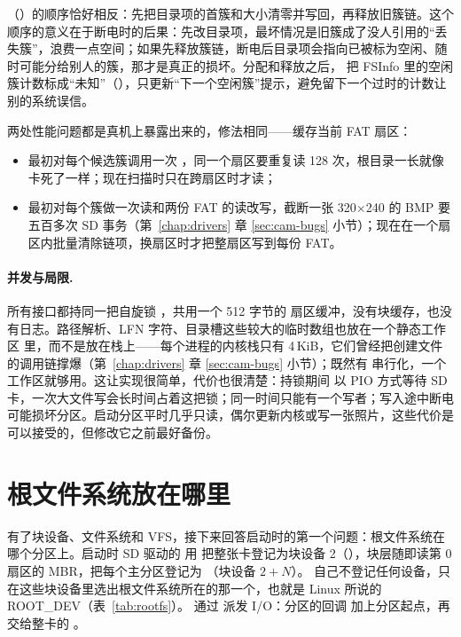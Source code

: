 （）的顺序恰好相反：先把目录项的首簇和大小清零并写回，再释放旧簇链。这个顺序的意义在于断电时的后果：先改目录项，最坏情况是旧簇成了没人引用的“丢失簇”，浪费一点空间；如果先释放簇链，断电后目录项会指向已被标为空闲、随时可能分给别人的簇，那才是真正的损坏。分配和释放之后， 把 FSInfo 里的空闲簇计数标成“未知”（），只更新“下一个空闲簇”提示，避免留下一个过时的计数让别的系统误信。

两处性能问题都是真机上暴露出来的，修法相同——缓存当前 FAT 扇区：
\begin{itemize}
  \item {} 最初对每个候选簇调用一次 ，同一个扇区要重复读 128 次，根目录一长就像卡死了一样；现在扫描时只在跨扇区时才读；
  \item {} 最初对每个簇做一次读和两份 FAT 的读改写，截断一张 320$\times$240 的 BMP 要五百多次 SD 事务（第~\ref{chap:drivers} 章 \ref{sec:cam-bugs} 小节）；现在在一个扇区内批量清除链项，换扇区时才把整扇区写到每份 FAT。
\end{itemize}

\paragraph{并发与局限.} 所有接口都持同一把自旋锁 ，共用一个 512 字节的  扇区缓冲，没有块缓存，也没有日志。路径解析、LFN 字符、目录槽这些较大的临时数组也放在一个静态工作区  里，而不是放在栈上——每个进程的内核栈只有 4\,KiB，它们曾经把创建文件的调用链撑爆（第~\ref{chap:drivers} 章 \ref{sec:cam-bugs} 小节）；既然有  串行化，一个工作区就够用。这让实现很简单，代价也很清楚：持锁期间  以 PIO 方式等待 SD 卡，一次大文件写会长时间占着这把锁；同一时间只能有一个写者；写入途中断电可能损坏分区。启动分区平时几乎只读，偶尔更新内核或写一张照片，这些代价是可以接受的，但修改它之前最好备份。

\section{根文件系统放在哪里}
\label{sec:rootfs}

有了块设备、文件系统和 VFS，接下来回答启动时的第一个问题：根文件系统在哪个分区上。启动时 SD 驱动的  用  把整张卡登记为块设备 2（），块层随即读第 0 扇区的 MBR，把每个主分区登记为 （块设备 $2+N$）。 自己不登记任何设备，只在这些块设备里选出根文件系统所在的那一个，也就是 Linux 所说的 ROOT\_DEV（表~\ref{tab:rootfs}）。 通过  派发 I/O：分区的回调  加上分区起点，再交给整卡的 。


